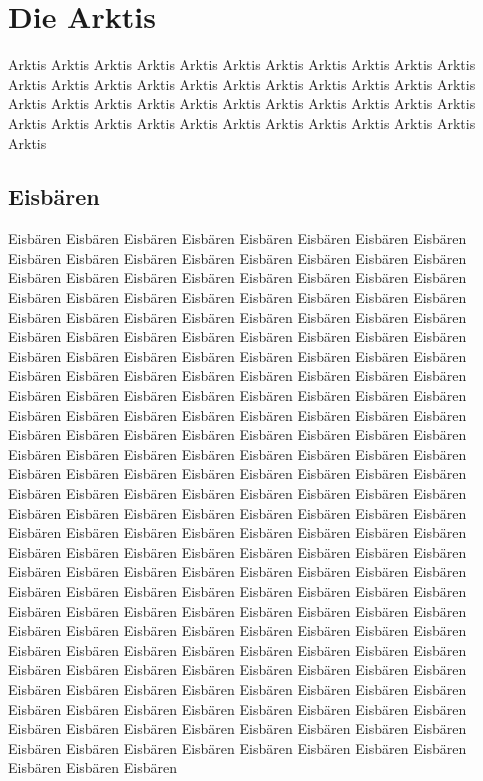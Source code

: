 \documentclass[a4paper, twoside, 12pt]{report}
\begin{document}
    \chapter{Die Arktis}
    \thispagestyle{fancy}

    Arktis Arktis Arktis Arktis Arktis Arktis Arktis Arktis Arktis Arktis Arktis Arktis Arktis Arktis Arktis Arktis Arktis Arktis Arktis Arktis Arktis Arktis Arktis Arktis Arktis Arktis Arktis Arktis Arktis Arktis Arktis Arktis Arktis Arktis Arktis Arktis Arktis Arktis Arktis Arktis Arktis Arktis Arktis Arktis Arktis

    \section{Eisb\"aren}

    Eisb\"aren Eisb\"aren Eisb\"aren Eisb\"aren Eisb\"aren Eisb\"aren Eisb\"aren Eisb\"aren Eisb\"aren Eisb\"aren Eisb\"aren Eisb\"aren Eisb\"aren Eisb\"aren Eisb\"aren Eisb\"aren Eisb\"aren Eisb\"aren Eisb\"aren Eisb\"aren Eisb\"aren Eisb\"aren Eisb\"aren Eisb\"aren Eisb\"aren Eisb\"aren Eisb\"aren Eisb\"aren Eisb\"aren Eisb\"aren Eisb\"aren Eisb\"aren Eisb\"aren Eisb\"aren Eisb\"aren Eisb\"aren Eisb\"aren Eisb\"aren Eisb\"aren Eisb\"aren Eisb\"aren Eisb\"aren Eisb\"aren Eisb\"aren Eisb\"aren Eisb\"aren Eisb\"aren Eisb\"aren Eisb\"aren Eisb\"aren Eisb\"aren Eisb\"aren Eisb\"aren Eisb\"aren Eisb\"aren Eisb\"aren Eisb\"aren Eisb\"aren Eisb\"aren Eisb\"aren Eisb\"aren Eisb\"aren Eisb\"aren Eisb\"aren Eisb\"aren Eisb\"aren Eisb\"aren Eisb\"aren Eisb\"aren Eisb\"aren Eisb\"aren Eisb\"aren Eisb\"aren Eisb\"aren Eisb\"aren Eisb\"aren Eisb\"aren Eisb\"aren Eisb\"aren Eisb\"aren Eisb\"aren Eisb\"aren Eisb\"aren Eisb\"aren Eisb\"aren Eisb\"aren Eisb\"aren Eisb\"aren Eisb\"aren Eisb\"aren Eisb\"aren Eisb\"aren Eisb\"aren Eisb\"aren Eisb\"aren Eisb\"aren Eisb\"aren Eisb\"aren Eisb\"aren Eisb\"aren  Eisb\"aren Eisb\"aren Eisb\"aren Eisb\"aren Eisb\"aren Eisb\"aren Eisb\"aren Eisb\"aren Eisb\"aren Eisb\"aren Eisb\"aren Eisb\"aren Eisb\"aren Eisb\"aren Eisb\"aren Eisb\"aren Eisb\"aren Eisb\"aren Eisb\"aren Eisb\"aren Eisb\"aren Eisb\"aren Eisb\"aren Eisb\"aren Eisb\"aren Eisb\"aren Eisb\"aren Eisb\"aren Eisb\"aren Eisb\"aren Eisb\"aren Eisb\"aren Eisb\"aren Eisb\"aren Eisb\"aren Eisb\"aren Eisb\"aren Eisb\"aren Eisb\"aren Eisb\"aren Eisb\"aren Eisb\"aren Eisb\"aren Eisb\"aren Eisb\"aren Eisb\"aren Eisb\"aren Eisb\"aren Eisb\"aren Eisb\"aren Eisb\"aren Eisb\"aren Eisb\"aren Eisb\"aren Eisb\"aren Eisb\"aren Eisb\"aren Eisb\"aren Eisb\"aren Eisb\"aren Eisb\"aren Eisb\"aren Eisb\"aren Eisb\"aren Eisb\"aren Eisb\"aren Eisb\"aren Eisb\"aren Eisb\"aren Eisb\"aren Eisb\"aren Eisb\"aren Eisb\"aren Eisb\"aren Eisb\"aren Eisb\"aren Eisb\"aren Eisb\"aren Eisb\"aren Eisb\"aren Eisb\"aren Eisb\"aren Eisb\"aren Eisb\"aren Eisb\"aren Eisb\"aren Eisb\"aren Eisb\"aren Eisb\"aren Eisb\"aren Eisb\"aren Eisb\"aren Eisb\"aren Eisb\"aren Eisb\"aren Eisb\"aren Eisb\"aren Eisb\"aren Eisb\"aren Eisb\"aren  Eisb\"aren Eisb\"aren Eisb\"aren Eisb\"aren Eisb\"aren Eisb\"aren Eisb\"aren Eisb\"aren Eisb\"aren Eisb\"aren Eisb\"aren Eisb\"aren Eisb\"aren Eisb\"aren Eisb\"aren Eisb\"aren Eisb\"aren Eisb\"aren Eisb\"aren 
\end{document}
